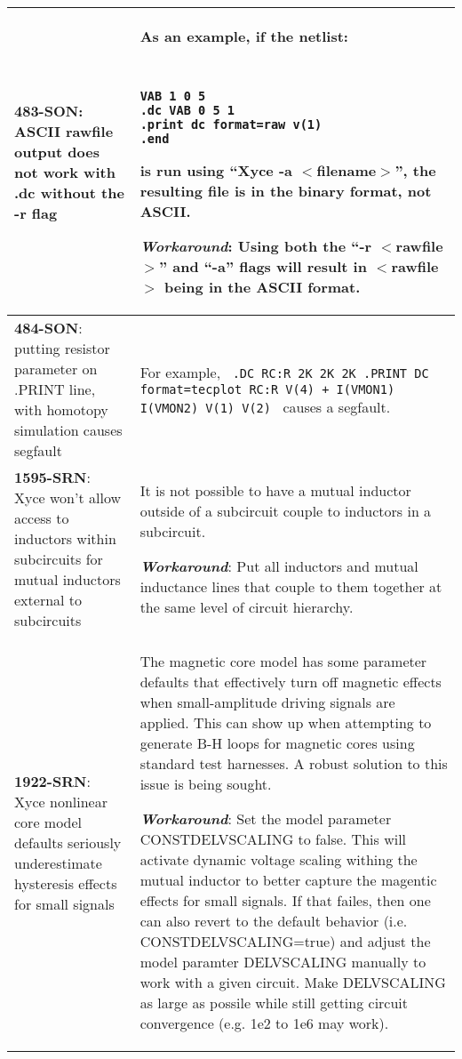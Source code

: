 \begin{longtable}[h] {>{\raggedright\small}m{2in}|>{\raggedright\let\\\tabularnewline\small}m{3.5in}}
\textbf{483-SON}: ASCII rawfile output does not work with .dc without the
-r flag &  As an example, if the netlist:
{\tt
\begin{verbatim}
VAB 1 0 5
.dc VAB 0 5 1
.print dc format=raw v(1) 
.end
\end{verbatim}
}
is run using ``Xyce -a $<$filename$>$'', the resulting file is in
 the binary format, not ASCII. 

\textbf{\textit{Workaround}}: Using both the ``-r $<$rawfile$>$'' and
``-a'' flags will result in $<$rawfile$>$ being in the ASCII format.
\\ \hline

\textbf{484-SON}: putting resistor parameter on .PRINT line, with homotopy simulation causes segfault &
For example,\newline
\texttt{
.DC RC:R 2K 2K 2K\newline
.PRINT DC format=tecplot RC:R V(4)\newline
+ I(VMON1) I(VMON2) V(1) V(2)\newline
}
causes a segfault.
\\ \hline

\textbf{1595-SRN}: Xyce won't allow access to inductors within subcircuits for
mutual inductors external to subcircuits & It is not possible to have a mutual
inductor outside of a subcircuit couple to inductors in a subcircuit.

\textbf{\textit{Workaround}}: Put all inductors and mutual inductance lines that couple to
them together at the same level of circuit hierarchy.
\\ \hline


\textbf{1922-SRN}: Xyce nonlinear core model defaults seriously underestimate
hysteresis effects for small signals & The magnetic core model has some
parameter defaults that effectively turn off magnetic effects when
small-amplitude driving signals are applied.  This can show up when attempting
to generate B-H loops for magnetic cores using standard test harnesses.  A
robust solution to this issue is being sought.

\textbf{\textit{Workaround}}: Set the model parameter CONSTDELVSCALING to false.  This
will activate dynamic voltage scaling withing the mutual inductor to better capture
the magentic effects for small signals.  If that failes, then one can also revert to 
the default behavior (i.e. CONSTDELVSCALING=true) and adjust the model paramter DELVSCALING
manually to work with a given circuit.  Make DELVSCALING as large as possile while 
still getting circuit convergence (e.g. 1e2 to 1e6 may work).
\\ \hline


\end{longtable}


